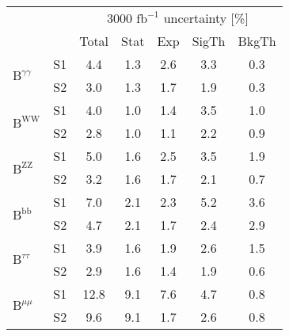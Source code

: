 \begin{tabular}{@{} l c c@{\hskip 0.15in} c c c c @{}}
 \hline
  &  & \multicolumn{5}{c}{3000 $\text{fb}^{-1}$ uncertainty [\%]} \\
  &  & Total & Stat & Exp & SigTh & BkgTh \\
 \hline
\multirow{2}{*}{$\mathrm{B}^{\gamma\gamma}$} & S1  & 4.4& 1.3 & 2.6 & 3.3 & 0.3  \\[1pt]
                        & S2  & 3.0& 1.3 & 1.7 & 1.9 & 0.3  \\[4pt]
\multirow{2}{*}{$\mathrm{B}^{\mathrm{WW}}$} & S1  & 4.0& 1.0 & 1.4 & 3.5 & 1.0  \\[1pt]
                        & S2  & 2.8& 1.0 & 1.1 & 2.2 & 0.9  \\[4pt]
\multirow{2}{*}{$\mathrm{B}^{\mathrm{ZZ}}$} & S1  & 5.0& 1.6 & 2.5 & 3.5 & 1.9  \\[1pt]
                        & S2  & 3.2& 1.6 & 1.7 & 2.1 & 0.7  \\[4pt]
\multirow{2}{*}{$\mathrm{B}^{\mathrm{bb}}$} & S1  & 7.0& 2.1 & 2.3 & 5.2 & 3.6  \\[1pt]
                        & S2  & 4.7& 2.1 & 1.7 & 2.4 & 2.9  \\[4pt]
\multirow{2}{*}{$\mathrm{B}^{\tau\tau }$} & S1  & 3.9& 1.6 & 1.9 & 2.6 & 1.5  \\[1pt]
                        & S2  & 2.9& 1.6 & 1.4 & 1.9 & 0.6  \\[4pt]
\multirow{2}{*}{$\mathrm{B}^{\mu\mu}$} & S1  & 12.8& 9.1 & 7.6 & 4.7 & 0.8  \\[1pt]
                        & S2  & 9.6& 9.1 & 1.7 & 2.6 & 0.8  \\[4pt]
\hline
\end{tabular}